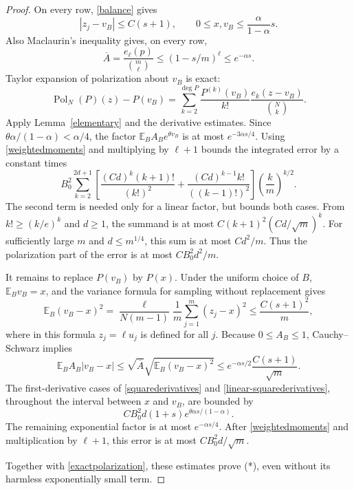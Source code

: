 \documentclass[11pt]{article}
\newcommand{\E}{\mathbb E}
\newcommand{\Pol}{\operatorname{Pol}}
\begin{document}
\begin{proof}
On every row, \eqref{balance} gives
\[
 |z_j-v_B|\le C(s+1),\qquad
 0\le x,v_B\le\frac{\alpha}{1-\alpha}s.
\]
Also Maclaurin's inequality gives, on every row,
\begin{equation}\label{abar}
 \overline A=\frac{e_\ell(p)}{\binom m\ell}
        \le(1-s/m)^\ell\le e^{-\alpha s}.
\end{equation}
Taylor expansion of polarization about $v_B$ is exact:
\[
 \Pol_N(P)(z)-P(v_B)
  =\sum_{k=2}^{\deg P}\frac{P^{(k)}(v_B)}{k!}
                   \frac{e_k(z-v_B)}{\binom Nk}.
\]
Apply Lemma~\ref{elementary} and the derivative estimates.
Since $\theta\alpha/(1-\alpha)<\alpha/4$, the factor
$\E_B A_Be^{\theta v_B}$ is at most $e^{-3\alpha s/4}$.
Using \eqref{weightedmoments} and multiplying by $\ell+1$ bounds the
integrated error by a constant times
\[
 B_0^2\sum_{k=2}^{2d+1}
 \left[
  \frac{(Cd)^k(k+1)!}{(k!)^2}
  +\frac{(Cd)^{k-1}k!}{((k-1)!)^2}
 \right]\left(\frac{k}{m}\right)^{k/2}.
\]
The second term is needed only for a linear factor, but bounds both
cases. From $k!\ge(k/e)^k$ and $d\ge1$, the summand is at most
$C(k+1)^2(Cd/\sqrt m)^k$. For sufficiently large $m$ and
$d\le m^{1/4}$, this sum is at most $Cd^2/m$. Thus the polarization
part of the error is at most $CB_0^2d^2/m$.

It remains to replace $P(v_B)$ by $P(x)$. Under the uniform choice
of $B$, $\E_Bv_B=x$, and the variance formula for sampling without
replacement gives
\[
 \E_B(v_B-x)^2
  =\frac{\ell}{N(m-1)}\frac1m\sum_{j=1}^m(z_j-x)^2
  \le\frac{C(s+1)^2}{m},
\]
where in this formula $z_j=\ell u_j$ is defined for all $j$.
Because $0\le A_B\le1$, Cauchy--Schwarz implies
\[
 \E_B A_B|v_B-x|
 \le\sqrt{\overline A}\sqrt{\E_B(v_B-x)^2}
 \le e^{-\alpha s/2}\frac{C(s+1)}{\sqrt m}.
\]
The first-derivative cases of \eqref{squarederivatives} and
\eqref{linear-squarederivatives}, throughout the interval between
$x$ and $v_B$, are bounded by
\[
 CB_0^2d(1+s)e^{\theta\alpha s/(1-\alpha)}.
\]
The remaining exponential factor is at most $e^{-\alpha s/4}$.
After \eqref{weightedmoments} and multiplication by $\ell+1$,
this error is at most $CB_0^2d/\sqrt m$.

Together with \eqref{exactpolarization}, these estimates prove (*),
even without its harmless exponentially small term.
\end{proof}
\end{document}
